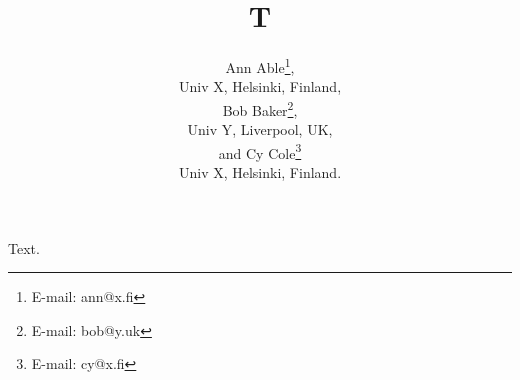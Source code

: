 \documentclass{article}
\begin{document}
\title{T}
\author{Ann Able\thanks{E-mail: ann@x.fi},\\
Univ X, Helsinki, Finland, \\
Bob Baker\thanks{E-mail: bob@y.uk},\\
Univ Y, Liverpool, UK, \\
and Cy Cole\thanks{E-mail: cy@x.fi}\\
Univ X, Helsinki, Finland.}
\maketitle
Text.
\end{document}
